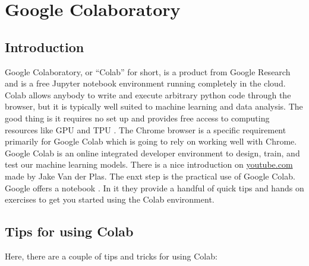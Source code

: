 %
%




\chapter{Google Colaboratory}

\section{Introduction}

Google Colaboratory, or ``Colab'' for short, is a product from Google Research and  is a free Jupyter notebook environment running completely in the cloud. Colab allows anybody to write and execute arbitrary python code through the browser, but it is typically well suited to machine learning and data analysis. The good thing is it requires no set up and provides free access to computing resources like GPU and TPU \cite{GoogleColab:2021}. The Chrome browser is a specific requirement primarily for Google Colab which is going to rely on working well with Chrome. 
Google Colab is an online integrated developer environment to design, train, and test our machine learning models. There is a nice introduction on \href{https://www.youtube.com/watch?v=inN8seMm7UI}{youtube.com} made by Jake Van der Plas. \Cite{VanderPlas:2019} The enxt step is the practical use of Google Colab. Google offers a notebook \href{}{}. In it they provide a handful of quick tips and hands on exercises to get you started using the Colab environment.



\section{Tips for using Colab}


Here, there are a couple of tips and tricks for using Colab:

